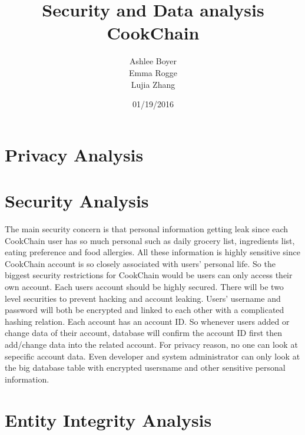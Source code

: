 \documentclass{article}
\title{\textbf{Security and Data analysis  \\ CookChain}}
\author{Ashlee Boyer \\Emma Rogge \\ Lujia Zhang}
\date{01/19/2016}
\begin{document}
\maketitle
\renewcommand*\contentsname{Table of Contents} 
\newpage
\tableofcontents
\clearpage
\section{Privacy Analysis}

\section{Security Analysis}
The main security concern is that personal information getting leak since each CookChain user has so much personal such as daily grocery list, ingredients list, eating preference and food allergies. All these information is highly sensitive since CookChain account is so closely associated with users' personal life. So the biggest security restrictions for CookChain would be users can only access their own account. Each users account should be highly secured. There will be two level securities to prevent hacking and account leaking. Users' username and password will both be encrypted and linked to each other with a complicated hashing relation. Each account has an account ID. So whenever users added or change data of their account, database will confirm the account ID first then add/change data into the related account. For privacy reason, no one can look at sepecific account data. Even developer and system administrator can only look at the big database table with encrypted usersname and other sensitive personal information.
\section{Entity Integrity Analysis}

\newpage
{}
 
\begin{thebibliography}{9}
\iffalse
\bibitem{latexcompanion} 
Michel Goossens, Frank Mittelbach, and Alexander Samarin. 
\textit{The \LaTeX\ Companion}. 
Addison-Wesley, Reading, Massachusetts, 1993.
 
\bibitem{einstein} 
Albert Einstein. 
\textit{Zur Elektrodynamik bewegter K{\"o}rper}. (German) 
[\textit{On the electrodynamics of moving bodies}]. 
Annalen der Physik, 322(10):891–921, 1905.
 
\bibitem{knuthwebsite} 
Knuth: Computers and Typesetting,
\\\texttt{http://www-cs-faculty.stanford.edu/\~{}uno/abcde.html}
\fi
\end{thebibliography}
 

 
\end{document}
